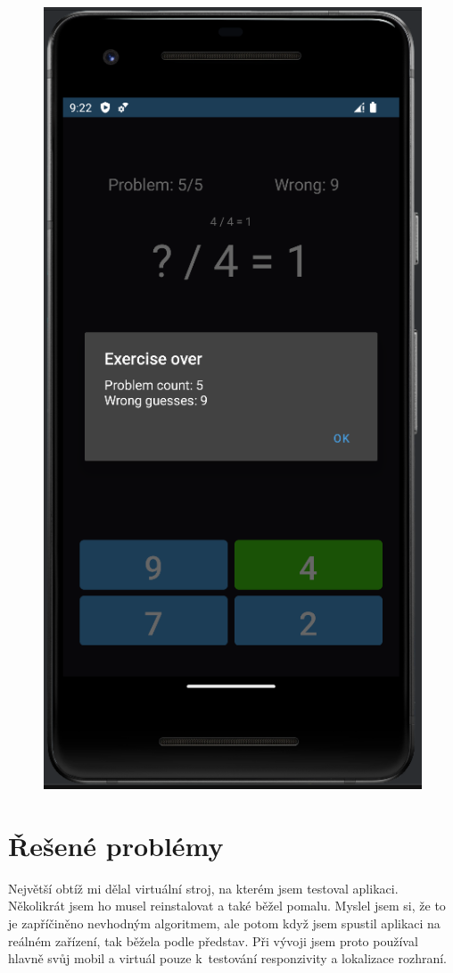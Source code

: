 \documentclass[12pt]{report}
\begin{document}
\begin{figure}[ht]
\begin{minipage}{.5\textwidth}
			\label{fig:dark_1}
		\end{minipage}%
		\hfill
		\begin{minipage}{.5\textwidth}
			\centering
			\includegraphics[height=1.7\textwidth]{img/dark_2}
			\label{fig:dark_2}
		\end{minipage}
	\end{figure}


	\chapter{Řešené problémy}
	Největší obtíž mi dělal virtuální stroj, na kterém jsem testoval aplikaci. Několikrát jsem ho musel reinstalovat a také běžel pomalu. Myslel jsem si, že to je zapříčiněno nevhodným algoritmem, ale potom když jsem spustil aplikaci na reálném zařízení, tak běžela podle představ. Při vývoji jsem proto používal hlavně svůj mobil a virtuál pouze k~testování responzivity a lokalizace rozhraní.
		
\end{document}
